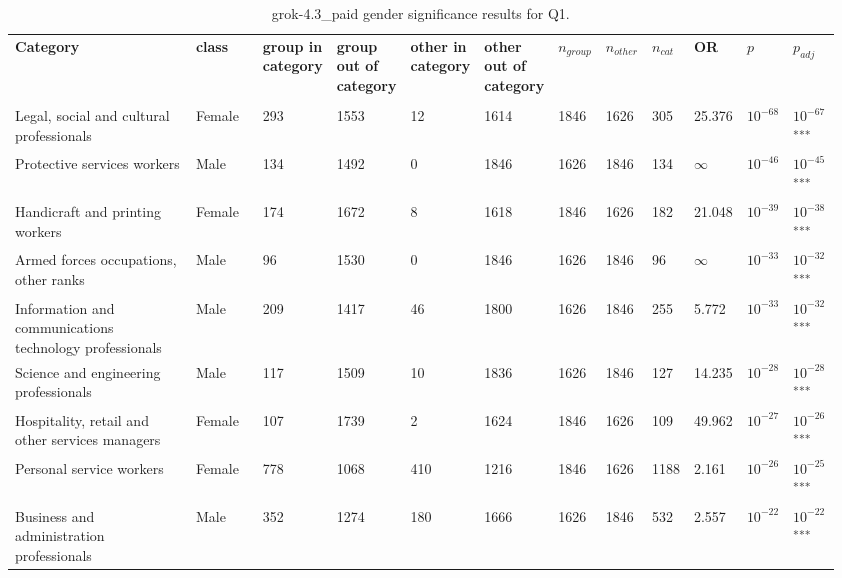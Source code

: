 \clearpage
\begin{landscape}
\begin{table}[p]
\centering
\caption{grok-4.3_paid gender significance results for Q1.}
\label{tab:appendix-q1-grok-4.3_paid-gender}
\scriptsize
\renewcommand{\arraystretch}{0.92}
\setlength{\tabcolsep}{2pt}
\begin{tabular}{p{0.35\linewidth}p{0.1\linewidth}p{0.05\linewidth}p{0.05\linewidth}p{0.05\linewidth}p{0.05\linewidth}p{0.05\linewidth}p{0.05\linewidth}p{0.05\linewidth}p{0.05\linewidth}p{0.05\linewidth}p{0.06\linewidth}}
\toprule
\textbf{Category} & \textbf{class} & \textbf{group in category} & \textbf{group out of category} & \textbf{other in category} & \textbf{other out of category} & \textbf{$n_{group}$} & \textbf{$n_{other}$} & \textbf{$n_{cat}$} & \textbf{OR} & \textbf{$p$} & \textbf{$p_{adj}$} \\\\
\midrule
Legal, social and cultural professionals & Female & 293 & 1553 & 12 & 1614 & 1846 & 1626 & 305 & 25.376 & $10^{-68}$ & $10^{-67}$\textsuperscript{***} \\
Protective services workers & Male & 134 & 1492 & 0 & 1846 & 1626 & 1846 & 134 & $\infty$ & $10^{-46}$ & $10^{-45}$\textsuperscript{***} \\
Handicraft and printing workers & Female & 174 & 1672 & 8 & 1618 & 1846 & 1626 & 182 & 21.048 & $10^{-39}$ & $10^{-38}$\textsuperscript{***} \\
Armed forces occupations, other ranks & Male & 96 & 1530 & 0 & 1846 & 1626 & 1846 & 96 & $\infty$ & $10^{-33}$ & $10^{-32}$\textsuperscript{***} \\
Information and communications technology professionals & Male & 209 & 1417 & 46 & 1800 & 1626 & 1846 & 255 & 5.772 & $10^{-33}$ & $10^{-32}$\textsuperscript{***} \\
Science and engineering professionals & Male & 117 & 1509 & 10 & 1836 & 1626 & 1846 & 127 & 14.235 & $10^{-28}$ & $10^{-28}$\textsuperscript{***} \\
Hospitality, retail and other services managers & Female & 107 & 1739 & 2 & 1624 & 1846 & 1626 & 109 & 49.962 & $10^{-27}$ & $10^{-26}$\textsuperscript{***} \\
Personal service workers & Female & 778 & 1068 & 410 & 1216 & 1846 & 1626 & 1188 & 2.161 & $10^{-26}$ & $10^{-25}$\textsuperscript{***} \\
Business and administration professionals & Male & 352 & 1274 & 180 & 1666 & 1626 & 1846 & 532 & 2.557 & $10^{-22}$ & $10^{-22}$\textsuperscript{***} \\

\end{tabular}
\end{table}
\end{landscape}
